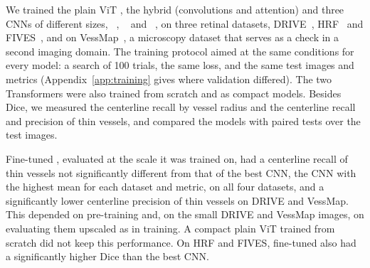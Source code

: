 We trained the plain ViT \medsam{}, the hybrid \litemedsam{} (convolutions and attention) and three CNNs of different sizes, \convnext{}~\cite{liu2022convnet}, \convunext{}~\cite{han2022convunext} and \lwnet{}~\cite{galdran2020littlewnetcouldstateoftheart}, on three retinal datasets, DRIVE~\cite{Staal2004}, HRF~\cite{budai2013robust} and FIVES~\cite{jin2022fives}, and on VessMap~\cite{viana2025new}, a microscopy dataset that serves as a check in a second imaging domain. The training protocol aimed at the same conditions for every model: a search of 100 trials, the same loss, and the same test images and metrics (Appendix~\ref{app:training} gives where validation differed). The two Transformers were also trained from scratch and as compact models. Besides Dice, we measured the centerline recall by vessel radius and the centerline recall and precision of thin vessels, and compared the models with paired tests over the test images.

Fine-tuned \medsam{}, evaluated at the scale it was trained on, had a centerline recall of thin vessels not significantly different from that of the best CNN, the CNN with the highest mean for each dataset and metric, on all four datasets, and a significantly lower centerline precision of thin vessels on DRIVE and VessMap. This depended on pre-training and, on the small DRIVE and VessMap images, on evaluating them upscaled as in training. A compact plain ViT trained from scratch did not keep this performance. On HRF and FIVES, fine-tuned \medsam{} also had a significantly higher Dice than the best CNN.

